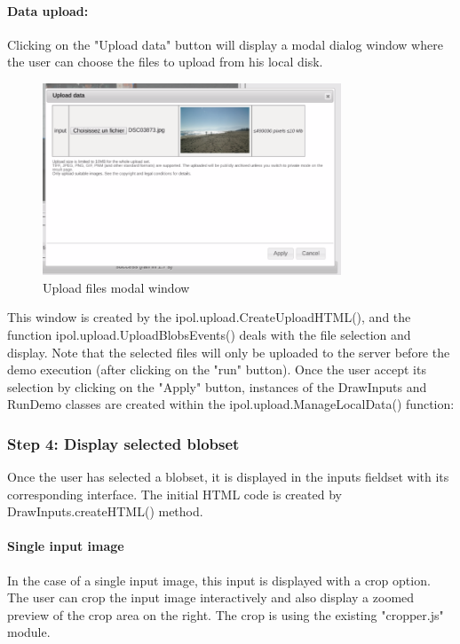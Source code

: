 \paragraph{Data upload:}

Clicking on the "Upload data" button will display a modal dialog window
where the user can choose the files to upload from his local disk.
\begin{figure}[H]
  \centering
  \includegraphics[width=3.5in]{Images/uploadwindow_capture}
  \caption{Upload files modal window}
  \label{img:uploadwindow_snapshot}
\end{figure}

This window is created by the ipol.upload.CreateUploadHTML(), and the function
ipol.upload.UploadBlobsEvents() deals with the file selection and display.
Note that the selected files will only be uploaded to the server before the
demo execution (after clicking on the "run" button).
Once the user accept its selection by clicking on the "Apply" button, 
instances of the DrawInputs and RunDemo classes are created within the 
ipol.upload.ManageLocalData() function:


\subsubsection{Step 4: Display selected blobset}
Once the user has selected a blobset, it is displayed in the inputs fieldset
with its corresponding interface.
The initial HTML code is created by DrawInputs.createHTML() method. 

\paragraph{Single input image}
In the case of a single input image, this input is displayed with a crop option.
The user can crop the input image interactively and also display a zoomed preview
of the crop area on the right. The crop is using the existing "cropper.js" module.

